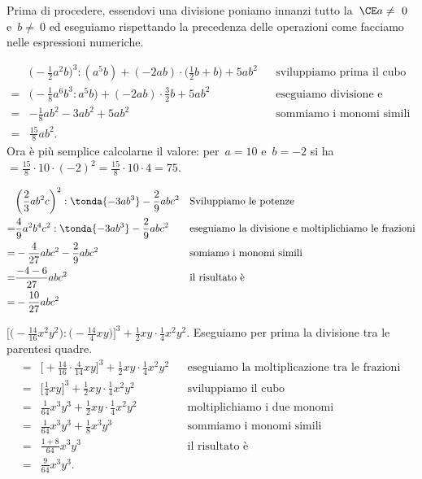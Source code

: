 Prima di procedere, essendovi una divisione poniamo innanzi tutto
la~\(\CE a \neq~0\) e~\(b \neq~0\) ed eseguiamo rispettando la precedenza
delle operazioni come facciamo nelle espressioni numeriche.
 \begin{esempio}
 \begin{align*}
&\bigg(-{\frac{1}{2}}a^{2}b\bigg)^{3}:(a^{5}b)+(-2ab)\cdot\bigg(\frac{1}{2}
b+b\bigg)+5ab^{2} && \text{sviluppiamo prima il cubo}\\
=&\bigg(-{\frac{1}{8}}a^{6}b^{3}:a^{5}b\bigg)+(-2ab)\cdot{\frac{3}{2}}b+5ab^
{2} && \text{eseguiamo divisione e moltiplicazione}\\
 =&-{\frac{1}{8}}ab^{2}-3ab^{2}+5ab^{2} && \text{sommiamo i monomi simili}\\
=&\frac{15}{8}ab^{2}.
 \end{align*}
 Ora è più semplice calcolarne il valore: per~\(a=10\) e~\(b=-2\) si
 ha~\(=\frac{15}{8}\cdot 10\cdot(-2)^{2}=\frac{15}{8}\cdot 10\cdot 4=75\).
 \end{esempio}

 \begin{esempio}
 \begin{align*}
 &\bigg(\frac{2}{3}ab^{2}c\bigg)^{2}:\tonda{-3ab^{3}}-\frac{2}{9}abc^{2} 
&& \text{Sviluppiamo le potenze}\\
 =&\frac{4}{9}a^{2}b^{4}c^{2}:\tonda{-3ab^{3}}-\frac{2}{9}abc^{2} && 
\text{eseguiamo la divisione e moltiplichiamo le frazioni}\\
 =&-{\frac{4}{27}}abc^{2}-\frac{2}{9}abc^{2} && \text{somiamo i monomi 
simili}\\
 =&\frac{-4-6}{27}abc^{2} && \text{il risultato è}\\
 =&-{\frac{10}{27}}abc^{2}
 \end{align*}
 \end{esempio}

 \begin{esempio}
\(\Bigg[\bigg(-{\frac{14}{16}}x^{2}y^{2}\bigg):\bigg(-{\frac{14}{4}}
xy\bigg)\Bigg]^{3}+\frac{1}{2}xy\cdot{\frac{1}{4}}x^{2}y^{2}\).
Eseguiamo per prima la divisione tra le parentesi quadre.
\begin{align*}
 =&\bigg[+{\frac{14}{16}}\cdot{\frac{4}{14}}xy\bigg]^{3}+\frac{1}{2}xy\cdot 
{\frac{1}{4}}x^{2}y^{2} && \text{eseguiamo la moltiplicazione tra le 
frazioni}\\
=&\bigg[\frac{1}{4}xy\bigg]^{3}+\frac{1}{2}xy\cdot{\frac{1}{4}}x^{2}y^{2} 
&& \text{sviluppiamo il cubo}\\
=&\frac{1}{64}x^{3}y^{3}+\frac{1}{2}xy\cdot {\frac{1}{4}}x^{2}y^{2} && 
\text{moltiplichiamo i due monomi}\\
=&\frac{1}{64}x^{3}y^{3}+\frac{1}{8}x^{3}y^{3} && \text{sommiamo i monomi 
simili}\\
=&\frac{1+8}{64}x^{3}y^{3} && \text{il risultato è}\\
=&\frac{9}{64}x^{3}y^{3}.
\end{align*}
 \end{esempio}

